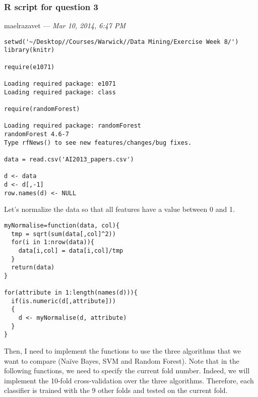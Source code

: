 \documentclass[]{article}
\title{}
\author{}
\date{}
\begin{document}
\maketitle

\subsubsection{R script for question 3}

maelrazavet --- \emph{Mar 10, 2014, 6:47 PM}

\lstset{basicstyle=\ttfamily\normalsize, breaklines=true}
\begin{lstlisting}[frame=single]
setwd('~/Desktop//Courses/Warwick//Data Mining/Exercise Week 8/')
library(knitr)

require(e1071)

Loading required package: e1071
Loading required package: class

require(randomForest)

Loading required package: randomForest
randomForest 4.6-7
Type rfNews() to see new features/changes/bug fixes.

data = read.csv('AI2013_papers.csv')

d <- data
d <- d[,-1]
row.names(d) <- NULL
\end{lstlisting}

Let's normalize the data so that all features have a value between 0 and
1.

\begin{lstlisting}[frame=single]
myNormalise=function(data, col){
  tmp = sqrt(sum(data[,col]^2))
  for(i in 1:nrow(data)){
    data[i,col] = data[i,col]/tmp
  }
  return(data)
}

for(attribute in 1:length(names(d))){
  if(is.numeric(d[,attribute])) 
  {
    d <- myNormalise(d, attribute)
  }
}
\end{lstlisting}

Then, I need to implement the functions to use the three algorithms that
we want to compare (Naïve Bayes, SVM and Random Forest). Note that in
the following functions, we need to specify the current fold number.
Indeed, we will implement the 10-fold cross-validation over the three
algorithms. Therefore, each classifier is trained with the 9 other folds
and tested on the current fold.
\end{document}
